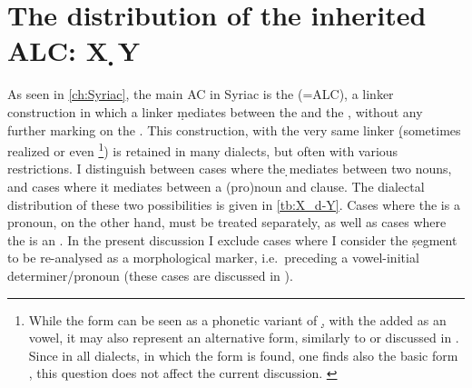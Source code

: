 \section{The distribution of the inherited ALC: X \d{}Y} \label{ss:d_lnk_dist}

As seen in \ref{ch:Syriac}, the main AC in Syriac is the  (=ALC), a linker construction in which a linker \d mediates between the \prim and the \secn, without any further marking on the \prim. This construction, with the very same linker \d (sometimes realized  or even \footnote{While the form  can be seen as a phonetic variant of \d, with the  added as an  vowel, it may also represent an alternative \lnk* form, similarly to  or  discussed in . Since in all dialects, in which the form  is found, one finds also the basic form , this question does not affect the current discussion. \label{ft:əd_lnk}}) is retained in many  dialects, but often with various restrictions. I distinguish between cases where the \d \lnk* mediates between two nouns, and cases where it mediates between a (pro)noun and clause. The dialectal distribution of these two possibilities is given in \vref{tb:X_d-Y}.
 Cases where the \secn is a pronoun, on the other hand, must be treated separately, as well as cases where the \prim is an . In the present discussion I exclude cases where I consider the \d segment to be re-analysed as a morphological \gen* marker, i.e.\ preceding a vowel-initial determiner/pronoun (these cases are discussed in ).


